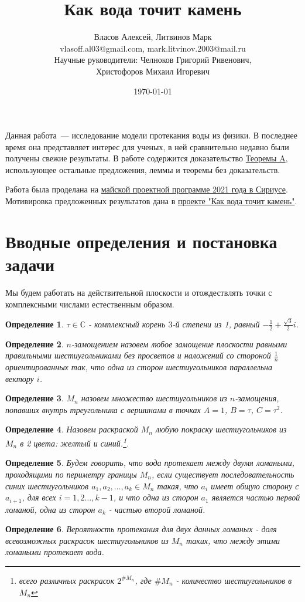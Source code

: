 \documentclass[russian,12pt]{article}
\title{Как вода точит камень}
\author{Власов Алексей, Литвинов Марк\\
vlasoff.al03@gmail.com, mark.litvinov.2003@mail.ru\\
Научные руководители: Челноков Григорий Ривенович,\\Христофоров Михаил Игоревич}
\date{\today}
\newtheorem{definition}{Определение}
\begin{document}
\maketitle

Данная работа~--- исследование модели протекания воды из физики. В последнее время она представляет интерес для ученых, в ней сравнительно недавно были получены свежие результаты. В работе содержится доказательство \hyperref[main-theorem]{Теоремы A}, использующее остальные предложения, леммы и теоремы без доказательств.

Работа была проделана на \href{https://sochisirius.ru/obuchenie/nauka/smena880/4228}{майской проектной программе 2021 года в Сириусе}. Мотивировка предложенных результатов дана в \href{https://www.dropbox.com/sh/ayulkt9ysl91819/AAAuiWwPJy20kZui9A_rEXnCa?dl=0&preview=discrete-20.05.pdf}{проекте "Как вода  точит камень"}.

\bigskip

\section*{Вводные определения и постановка задачи}

Мы будем работать на действительной плоскости и отождествлять точки с комплексными числами естественным образом.

\begin{definition} \label{tau}
$\tau \in \mathbb{C}$ - комплексный корень $3$-й степени из 1, равный $-\frac{1}{2} + \frac{\sqrt{3}}{2}i$.
\end{definition}

\begin{definition}
$n$-замощением назовем любое замощение плоскости равными правильными шестиугольниками без просветов и наложений со стороной $\frac{1}{n}$ ориентированных так, что одна из сторон шестиугольников параллельна вектору $i$. 
\end{definition}
\begin{definition}
$M_n$ назовем множество шестиугольников из $n$-замощения, попавших внутрь треугольника с вершинами в точках $A = 1$, $B = \tau$, $C = \tau^2$.
\end{definition}
\begin{definition}
Назовем раскраской $M_n$ любую покраску шестиугольников из $M_n$ в 2 цвета: желтый и синий.\footnote{всего различных раскрасок $2^ {\#M_n}$, где $\#M_n$ - количество шестиугольников в $M_n$}.
\end{definition}
\begin{definition}
Будем говорить, что \emph{вода протекает между двумя ломаными}, проходящими по периметру границы $M_n$, если существует последовательность синих шестиугольников $a_1, a_2, \dots, a_k \in M_n$ такая, что $a_i$ имеет общую сторону с $a_{i+1}$, для всех $i=1,2 \dots, k-1$, и что одна из сторон $a_1$ является частью первой ломаной, одна из сторон $a_k$ - частью второй ломаной.
\end{definition}
\begin{definition}
Вероятность протекания для двух данных ломаных - доля всевозможных раскрасок шестиугольников из $M_n$ таких, что между этими ломаными протекает вода.
\end{definition}
\end{document}
